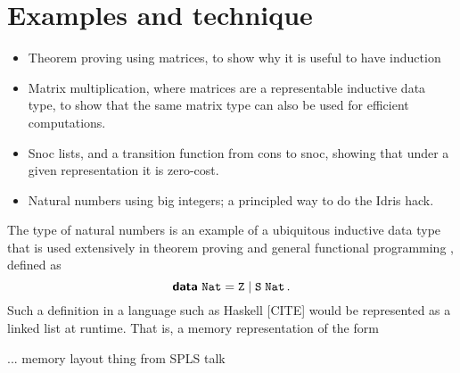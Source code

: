 \section{Examples and technique}\label{sec:technique}

\begin{itemize}
  \item Theorem proving using matrices, to show why it is useful to have induction
  \item Matrix multiplication, where matrices are a representable inductive data type,
        to show that the same matrix type can also be used for efficient computations.
  \item Snoc lists, and a transition function from cons to snoc, showing that under a
        given representation it is zero-cost.
  \item Natural numbers using big integers; a principled way to do the Idris hack.
\end{itemize}

The type of natural numbers is an example of a ubiquitous  inductive data type that is used extensively in theorem
proving and general functional programming , defined as
\begin{equation}\label{eq:nat-ind}
  \textsf{\textbf{data}}\ \texttt{Nat} = \texttt{Z} \mid \texttt{S}\;\texttt{Nat} \,.
\end{equation}
Such a definition in a language such as Haskell [CITE] would be represented as
a linked list at runtime. That is, a memory representation of the form 

... memory layout thing from SPLS talk

